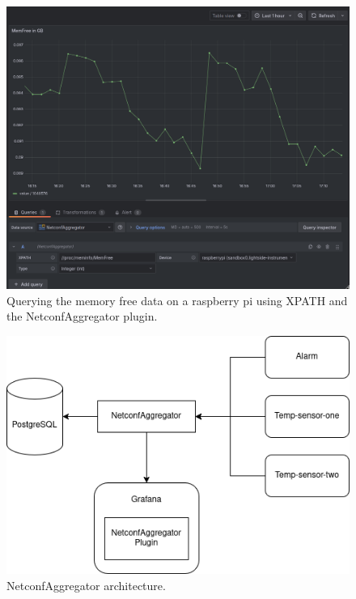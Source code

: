 \documentclass[12pt]{article}
\begin{document}
\begin{figure}
  \centering
  \includegraphics[width=\textwidth]{memfree.png}
  \caption{Querying the memory free data on a raspberry pi using XPATH and the NetconfAggregator plugin.}
  \label{fig:netconf-aggregator-memfree}
\end{figure}

\begin{figure}
  \centering
  \includegraphics[width=\textwidth]{NetconfAggregator.png}
  \caption{NetconfAggregator architecture.}
  \label{fig:netconf-aggregator}
\end{figure}

\newpage
\end{document}
